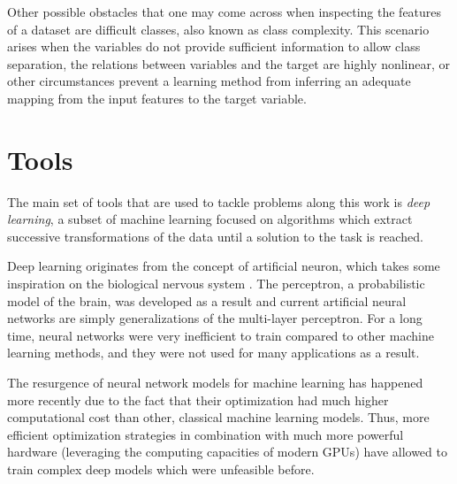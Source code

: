 





Other possible obstacles that one may come across when inspecting the features of a dataset are difficult classes, also known as class complexity. This scenario arises when the variables do not provide sufficient information to allow class separation, the relations between variables and the target are highly nonlinear, or other circumstances prevent a learning method from inferring an adequate mapping from the input features to the target variable.


\section{Tools}

The main set of tools that are used to tackle problems along this work is \textit{deep learning}, a subset of machine learning focused on algorithms which extract successive transformations of the data until a solution to the task is reached.

Deep learning originates from the concept of artificial neuron, which takes some inspiration on the biological nervous system . The perceptron, a probabilistic model of the brain, was developed as a result  and current artificial neural networks are simply generalizations of the multi-layer perceptron. For a long time, neural networks were very inefficient to train compared to other machine learning methods, and they were not used for many applications as a result.

The resurgence of neural network models for machine learning has happened more recently due to the fact that their optimization had much higher computational cost than other, classical machine learning models. Thus, more efficient optimization strategies in combination with much more powerful hardware (leveraging the computing capacities of modern GPUs) have allowed to train complex deep models which were unfeasible before.

